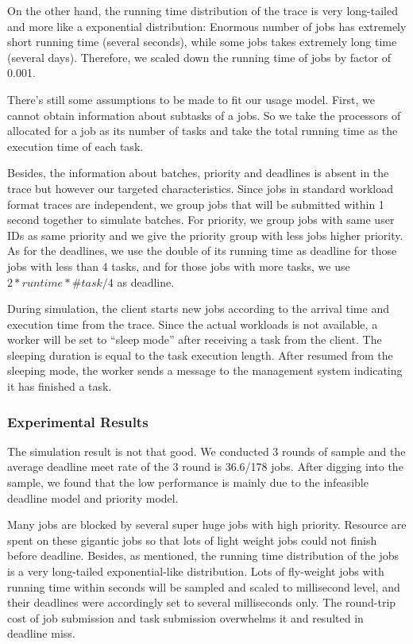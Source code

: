 On the other hand, the running time distribution of the trace is very
long-tailed and more like a exponential distribution: Enormous number of
jobs has extremely short running time (several seconds), while some jobs
takes extremely long time (several days).
Therefore, we scaled down the running time of jobs by factor of 0.001.

There's still some assumptions to be made to fit our usage model.
First, we cannot obtain information about subtasks of a jobs.
So we take the processors of allocated for a job as its number of tasks
and take the total running time as the execution time of each task.

Besides, the information about batches, priority and deadlines is absent
in the trace but however our targeted characteristics.
Since jobs in standard workload format traces are independent,
we group jobs that will be submitted within 1 second together to
simulate batches.
For priority, we group jobs with same user IDs as same priority and we
give the priority group with less jobs higher priority.
As for the deadlines, we use the double of its running time as deadline
for those jobs with less than 4 tasks, and for those jobs with more
tasks, we use $2 * runtime * \#task / 4$ as deadline.

During simulation, the client starts new jobs according to the arrival
time and execution time from the trace.
Since the actual workloads is not available, a worker will be set to
``sleep mode'' after receiving a task from the client.
The sleeping duration is equal to the task execution length.
After resumed from the sleeping mode, the worker sends a message to the
management system indicating it has finished a task.

\subsubsection{Experimental Results}

The simulation result is not that good. We conducted 3 rounds of sample
and the average deadline meet rate of the 3 round is 36.6/178 jobs.
After digging into the sample, we found that the low performance is
mainly due to the infeasible deadline model and priority model.

Many jobs are blocked by several super huge jobs with high priority.
Resource are spent on these gigantic jobs so that lots of light weight
jobs could not finish before deadline.
Besides, as mentioned, the running time distribution of the jobs is a
very long-tailed exponential-like distribution.
Lots of fly-weight jobs with running time within seconds will be sampled
and scaled to millisecond level, and their deadlines were accordingly
set to several milliseconds only.
The round-trip cost of job submission and task submission overwhelms it
and resulted in deadline miss.

